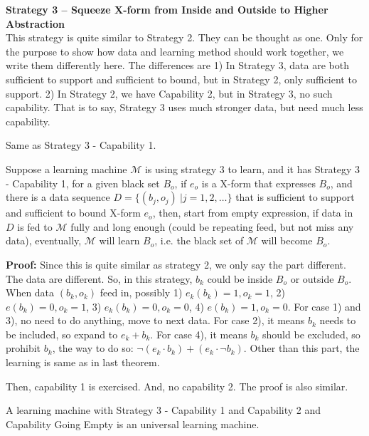 {\bf Strategy 3 -- Squeeze X-form from Inside and Outside to Higher Abstraction}\\
This strategy is quite similar to Strategy 2. They can be thought as one. Only for the purpose to show how data and learning method should work together, we write them differently here. The differences are 1) In Strategy 3, data are both sufficient to support and sufficient to bound, but in Strategy 2, only sufficient to support. 2) In Strategy 2, we have  Capability 2, but in Strategy 3, no such capability. That is to say, Strategy 3 uses much stronger data, but need much less capability. 

\begin{definition}
Same as Strategy 3 - Capability 1.
\end{definition}



\begin{theorem}
Suppose a learning machine $\mathcal{M}$ is using strategy 3 to learn, and it has Strategy 3 - Capability 1, for a given black set $B_o$, if $e_o$ is a X-form that expresses $B_o$, and there is a data sequence $D = \{ (b_j, o_j) \ | j = 1, 2, \ldots \}$ that is sufficient to support and sufficient to bound X-form $e_o$, then, start from empty expression, if data in $D$ is fed to $\mathcal{M}$ fully and long enough (could be repeating feed, but not miss any data), eventually, $\mathcal{M}$ will learn $B_o$, i.e. the black set of $\mathcal{M}$ will become $B_o$.        
\end{theorem}
{\bf Proof:} Since this is quite similar as strategy 2, we only say the part different. The data are different. So, in this strategy, $b_k$ could be inside $B_o$ or outside $B_o$. When data $(b_k, o_k)$ feed in, possibly  1) $e_k(b_k) = 1, o_k = 1$, 2)  $e(b_k) = 0, o_k = 1$, 3) $e_k(b_k) = 0, o_k = 0$, 4)  $e(b_k) = 1, o_k = 0$. For case 1) and 3), no need to do anything, move to next data. For case 2), it means $b_k$ needs to be included, so expand to $e_k + b_k$. For case 4), it means $b_k$ should be excluded, so prohibit $b_k$, the way to do so: $\neg (e_k \cdot b_k) + (e_k  \cdot \neg b_k)$. Other than this part, the learning is same as in last theorem. 

Then, capability 1 is exercised. And, no capability 2. The proof is also similar. 


\begin{corollary}
A learning machine with Strategy 3 - Capability 1 and Capability 2 and Capability Going Empty is an universal learning machine.
\end{corollary}





